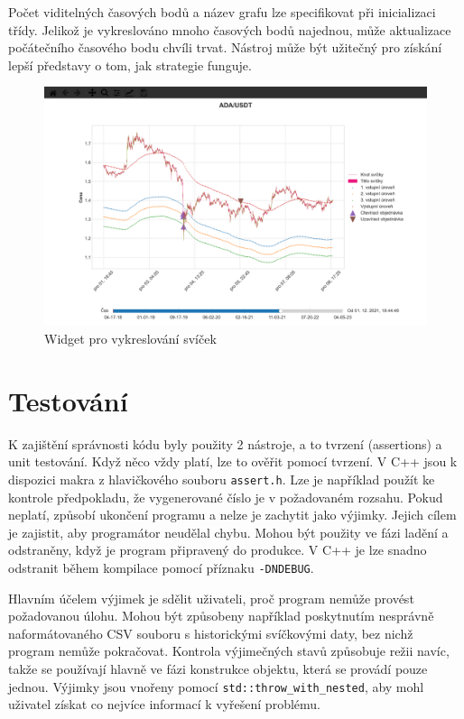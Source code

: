 Počet viditelných časových bodů a název grafu lze specifikovat při inicializaci třídy.
Jelikož je vykreslováno mnoho časových bodů najednou, může aktualizace počátečního časového bodu chvíli trvat.
Nástroj může být užitečný pro získání lepší představy o tom, jak strategie funguje.

\begin{figure}[htbp]
\centerline{\includegraphics[scale=0.3]{img/historical-simulation-widget-2.png}}
\caption{Widget pro vykreslování svíček}
\label{fig:historical-simulation-widget}
\end{figure}

\chapter{Testování}
K zajištění správnosti kódu byly použity 2 nástroje, a to tvrzení (assertions) a unit testování.
Když něco vždy platí, lze to ověřit pomocí tvrzení.
V C++ jsou k dispozici makra z hlavičkového souboru \texttt{assert.h}.
Lze je například použít ke kontrole předpokladu, že vygenerované číslo je v požadovaném rozsahu.
Pokud neplatí, způsobí ukončení programu a nelze je zachytit jako výjimky.
Jejich cílem je zajistit, aby programátor neudělal chybu.
Mohou být použity ve fázi ladění a odstraněny, když je program připravený do produkce.
V C++ je lze snadno odstranit během kompilace pomocí příznaku \texttt{-DNDEBUG}.

Hlavním účelem výjimek je sdělit uživateli, proč program nemůže provést požadovanou úlohu.
Mohou být způsobeny například poskytnutím nesprávně naformátovaného CSV souboru s historickými svíčkovými daty, bez nichž program nemůže pokračovat.
Kontrola výjimečných stavů způsobuje režii navíc, takže se používají hlavně ve fázi konstrukce objektu, která se provádí pouze jednou.
Výjimky jsou vnořeny pomocí \texttt{std::throw\_with\_nested}, aby mohl uživatel získat co nejvíce informací k vyřešení problému.

